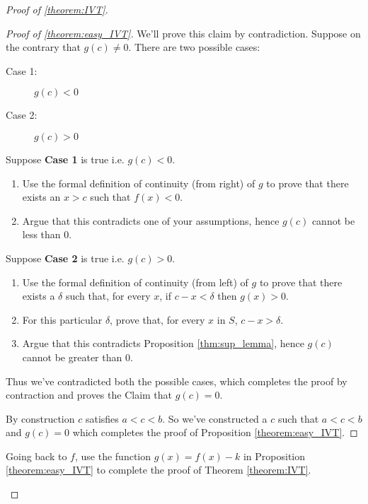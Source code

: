 \begin{proof}[Proof of \ref{theorem:IVT}]
\begin{proof}[Proof of \ref{theorem:easy_IVT}]
		We'll prove this claim by contradiction. Suppose on the contrary that $g(c) \neq 0$. There are two possible cases:\\
		\begin{indentPara}
      \begin{description}
  			\item[Case 1:] $g(c) < 0$
  			\item[Case 2:] $g(c) > 0$\\
  		\end{description}
    \end{indentPara}
		Suppose {\bf Case 1} is true i.e. $g(c) < 0$.
		\begin{exercise}
			\begin{enumerate}
				\item Use the formal definition of continuity (from right) of $g$ to prove that there exists an $x > c$ such that $f(x) < 0$.
				\item Argue that this contradicts one of your assumptions, hence $g(c)$ cannot be less than 0.
			\end{enumerate}
		\end{exercise}
		\noindent Suppose {\bf Case 2} is true i.e. $g(c)> 0$.
		\begin{exercise}
			\begin{enumerate}
				\item Use the formal definition of continuity (from left) of $g$ to prove that there exists a $\delta$ such that, for every $x$, if $c - x < \delta$ then $g(x) > 0$.\hint{Use $\epsilon = g(c)/2$.}
  				\item For this particular $\delta$, prove that, for every $x$ in $S$, $c - x > \delta$.
				\item Argue that this contradicts Proposition \ref{thm:sup_lemma}, hence $g(c)$ cannot be greater than 0.
			\end{enumerate}
		\end{exercise}
		Thus we've contradicted both the possible cases, which completes the proof by contraction and proves the Claim that $g(c) = 0$.

    By construction $c$ satisfies $ a < c < b$. So we've constructed a $c$ such that $a < c < b$ and $g(c) = 0$ which completes the proof of Proposition \ref{theorem:easy_IVT}.
	\end{proof}
	\begin{exercise}
		Going back to $f$, use the function $g(x) = f(x) - k$ in Proposition \ref{theorem:easy_IVT} to complete the proof of Theorem \ref{theorem:IVT}.
	\end{exercise}
\end{proof}


